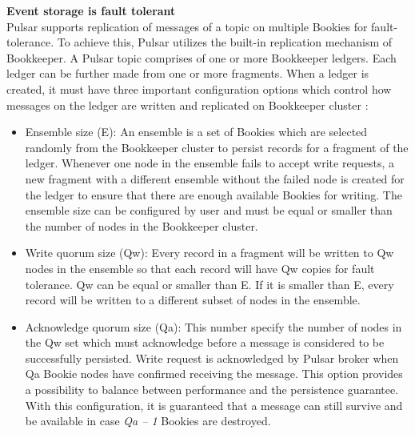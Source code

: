 \textbf{Event storage is fault tolerant}\\
Pulsar supports replication of messages of a topic on multiple Bookies for fault-tolerance. To achieve this, Pulsar utilizes the built-in replication mechanism of Bookkeeper. A Pulsar topic comprises of one or more Bookkeeper ledgers. Each ledger can be further made from one or more fragments. When a ledger is created, it must have three important configuration options which control how messages on the ledger are written and replicated on Bookkeeper cluster \cite{bookkeeperprotocol}:
\begin{itemize}
	\item Ensemble size (E): An ensemble is a set of Bookies which are selected randomly from the Bookkeeper cluster to persist records for a fragment of the ledger. Whenever one node in the ensemble fails to accept write requests, a new fragment with a different ensemble without the failed node is created for the ledger to ensure that there are enough available Bookies for writing. The ensemble size can be configured by user and must be equal or smaller than the number of nodes in the Bookkeeper cluster.
	\item Write quorum size (Qw): Every record in a fragment will be written to Qw nodes in the ensemble so that each record will have Qw copies for fault tolerance. Qw can be equal or smaller than E. If it is smaller than E, every record will be written to a different subset of nodes in the ensemble.
	\item Acknowledge quorum size (Qa): This number specify the number of nodes in the Qw set which must acknowledge before a message is considered to be successfully persisted. Write request is acknowledged by Pulsar broker when Qa Bookie nodes have confirmed receiving the message. This option provides a possibility to balance between performance and the persistence guarantee. With this configuration, it is guaranteed that a message can still survive and be available in case \emph{Qa – 1} Bookies are destroyed.
\end{itemize}


